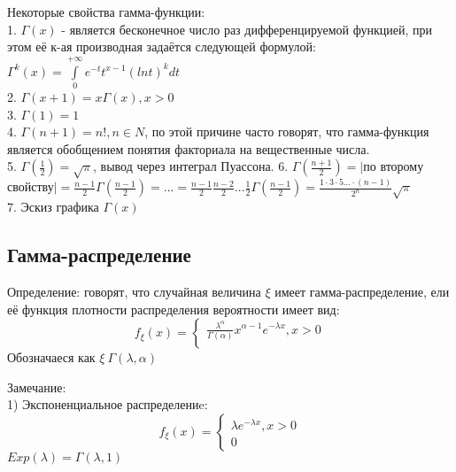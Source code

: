 Некоторые свойства гамма-функции:\\
1. $\Gamma(x)$ - является бесконечное число раз дифференцируемой функцией, при этом её к-ая производная задаётся следующей формулой:\\
$\Gamma^{k}(x) = \int\limits_{0}^{+\infty} e^{-t} t^{x - 1} (ln t)^{k} dt$\\
2. $\Gamma(x + 1) = x\Gamma(x), x > 0$\\
3. $\Gamma(1) = 1$\\
4. $\Gamma(n + 1) = n!, n \in N$, по этой причине часто говорят, что гамма-функция является обобщением понятия факториала на вещественные числа.\\
5. $\Gamma(\frac{1}{2}) = \sqrt{\pi}$, вывод через интеграл Пуассона.
6. $\Gamma(\frac{n+1}{2}) = \bigg| $по второму свойству$\bigg| = \frac{n-1}{2}\Gamma(\frac{n-1}{2}) = ... = \frac{n-1}{2} \frac{n-2}{2} ...  \frac{1}{2} \Gamma(\frac{n-1}{2}) = \frac{1 \cdot 3 \cdot 5 ... \cdot (n - 1)}{2^{n}}\sqrt{\pi}$\\
7. Эскиз графика $\Gamma(x)$\\
\begin{figure}[H]
	\center{\texttt{[image: 5\_5]}}
\end{figure}

\subsection{Гамма-распределение}
Определение: говорят, что случайная величина $\xi$ имеет гамма-распределение, ели её функция плотности распределения вероятности имеет вид:\\
\begin{equation}
f_{\xi}(x) = 
\begin{cases}
\frac{\lambda^{\alpha}}{\Gamma(\alpha)} x^{\alpha - 1} e^{-\lambda x}, x  > 0\\

\end{cases}
\end{equation}
Обозначаеся как $\xi ~ \Gamma(\lambda, \alpha)$

Замечание:\\
1) Экспоненциальное распределениe:\\
\begin{equation}
f_{\xi}(x) = 
\begin{cases}
\lambda e^{-\lambda x}, x  > 0\\
0
\end{cases}
\end{equation}
$Exp(\lambda) = \Gamma(\lambda, 1)$\\

